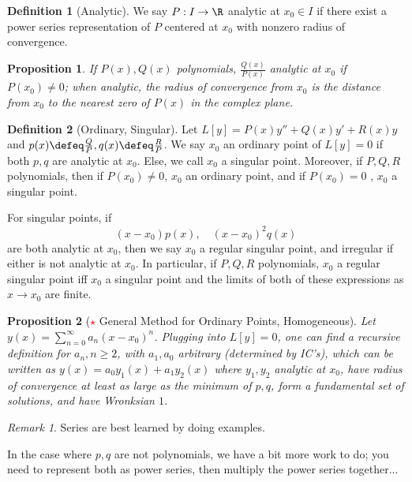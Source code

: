 \documentclass[12pt, oneside]{article}
\theoremstyle{definition}
\newtheorem{defn}{Definition}
\theoremstyle{plain}
\newtheorem{prop}{Proposition}
\theoremstyle{remark}
\newtheorem{remark}{Remark}
\begin{document}
\begin{defn}[Analytic]
  We say $P : I \to \R$ analytic at $x_0 \in I$ if there exist a power series representation of $P$ centered at $x_0$ with nonzero radius of convergence.
\end{defn}

\begin{prop}
  If $P(x), Q(x)$ polynomials, $\frac{Q(x)}{P(x)}$ analytic at $x_0$ if $P(x_0) \neq 0$; when analytic, the radius of convergence from $x_0$ is the distance from $x_0$ to the nearest zero of $P(x)$ in the complex plane.
\end{prop}

\begin{defn}[Ordinary, Singular]
  Let $L[y] = P(x) y''  + Q(x) y' + R(x) y$ and $p(x) \defeq \frac{Q}{P}, q(x) \defeq \frac{R}{P}$. We say $x_0$ an ordinary point of $L[y] = 0$ if both $p, q$ are analytic at $x_0$. Else, we call $x_0$ a singular point. Moreover, if $P, Q, R$ polynomials, then if $P(x_0) \neq 0$, $x_0$ an ordinary point, and if $P(x_0) = 0$ , $x_0$ a singular point.

  For singular points, if \[
  (x - x_0) p(x), \quad (x - x_0)^2 q(x)
  \]
  are both analytic at $x_0$, then we say $x_0$ a regular singular point, and irregular if either is not analytic at $x_0$. In particular, if $P, Q, R$ polynomials, $x_0$ a regular singular point iff $x_0$ a singular point and the limits of both of these expressions as $x \to x_0$ are finite.
\end{defn}

\begin{prop}[\textcolor{red}{$\star$} General Method for Ordinary Points, Homogeneous]
  Let $y(x) = \sum_{n=0}^\infty a_n (x - x_0)^n$. Plugging into $L[y] = 0$, one can find a recursive definition for $a_n, n \geq 2$, with $a_1, a_0$ arbitrary (determined by IC's), which can be written as $y(x) = a_0 y_1(x) + a_1 y_2(x)$ where $y_1, y_2$ analytic at $x_0$, have radius of convergence at least as large as the minimum of $p, q$, form a fundamental set of solutions, and have Wronksian $1$.
\end{prop}

\begin{remark}
  Series are best learned by doing examples.

  In the case where $p, q$ are not polynomials, we have a bit more work to do; you need to represent both as power series, then multiply the power series together...
\end{remark}
\end{document}
